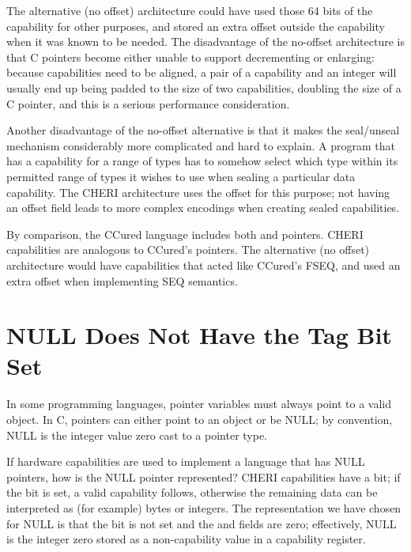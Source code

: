 The alternative (no offset) architecture could have used those 64 bits
of the capability for other purposes, and stored an extra offset outside
the capability when it was known to be needed.  The disadvantage of the
no-offset architecture is that C pointers become either unable to support
decrementing or enlarging: because capabilities need to be aligned, a pair of a
capability and an integer will usually end up
being padded to the size of two capabilities, doubling the size of a C pointer,
and this is a serious performance consideration.

Another disadvantage of the no-offset alternative is that it makes the
seal/unseal mechanism considerably more complicated and hard to explain.
A program that has a capability for a range of types has to somehow select
which type within its permitted range of types it wishes to use when sealing a
particular data capability. The CHERI architecture uses the offset for this
purpose; not having an offset field leads to more complex encodings when
creating sealed capabilities.

By comparison, the CCured language includes both  and
 pointers. CHERI capabilities are analogous to CCured's
 pointers. The alternative (no offset) architecture
would have capabilities that acted like CCured's FSEQ, and used an extra
offset when implementing SEQ semantics.

\section{NULL Does Not Have the Tag Bit Set}

In some programming languages, pointer variables must always point to
a valid object. In C, pointers can either point to an object or be NULL;
by convention, NULL is the integer value zero cast to a pointer type.

If hardware capabilities are used to implement a language that has NULL
pointers, how is the NULL pointer represented? CHERI capabilities have
a \ctag{} bit; if the \ctag{} bit is set, a valid capability follows, otherwise
the remaining data can be interpreted as (for example) bytes or integers.
The representation we have chosen for NULL is that the \ctag{} bit is not set
and the \cbase{} and \clength{} fields are zero; effectively, NULL is the
integer zero stored as a non-capability value in a capability register.

